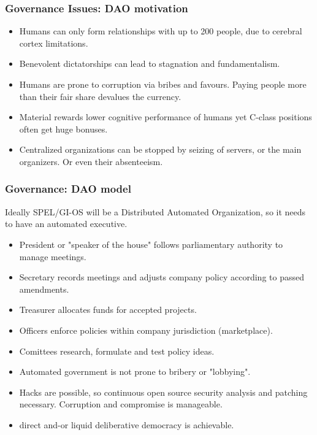 \documentclass{beamer}
\begin{document}
\begin{frame}
  \frametitle{Governance Issues: DAO motivation}
  \begin{itemize}
    \item Humans can only form relationships with up to 200 people,
          due to cerebral cortex limitations. 
    \item Benevolent dictatorships can lead to stagnation and fundamentalism. 
    \item Humans are prone to corruption via bribes and favours. Paying people
more than their fair share devalues the currency. 
    \item Material rewards lower cognitive performance of humans yet 
          C-class positions often get huge bonuses.
    \item Centralized organizations can be stopped by seizing of servers, 
          or the main organizers. Or even their absenteeism. 
  \end{itemize}
\end{frame}

\begin{frame}
  \frametitle{Governance: DAO model}
  Ideally SPEL/GI-OS will be a Distributed Automated Organization, so it needs
  to have an automated executive.
  \begin{itemize}
    \item President or "speaker of the house" follows parliamentary authority 
          to manage meetings.  
    \item Secretary records meetings and adjusts company policy according to
          passed amendments.
    \item Treasurer allocates funds for accepted projects. 
    \item Officers enforce policies within company jurisdiction (marketplace).
    \item Comittees research, formulate and test policy ideas. 
    \item Automated government is not prone to bribery or "lobbying". 
    \item Hacks are possible, so continuous open source security analysis
           and patching necessary.  Corruption and compromise is manageable.
    \item direct and-or liquid deliberative democracy is achievable. 
  \end{itemize}
\end{frame}
\end{document}
